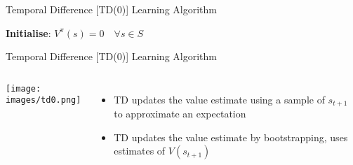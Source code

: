 \documentclass[aspectratio=169]{../latex_main/tntbeamer}  %
\begin{document}
\begin{frame}[c]{Temporal Difference [TD(0)] Learning Algorithm}
	
	\begin{algorithm}[H]
    \caption{TD(0)}
    \LinesNotNumbered
    \DontPrintSemicolon
    \textbf{Initialise}: $V^\pi(s) = 0 \quad \forall s \in S$
    
\end{algorithm}
	
\end{frame}
\begin{frame}[c]{Temporal Difference [TD(0)] Learning Algorithm}

\begin{columns}
	
	
	\texttt{[image: images/td0.png]}
	
	
	\begin{itemize}
		\item TD updates the value estimate using a sample of $s_{t+1}$ to approximate an expectation
		\item TD updates the value estimate by bootstrapping, uses estimates of $V(s_{t+1})$
	\end{itemize}
	
	
\end{columns}	

\end{frame}
\end{document}
